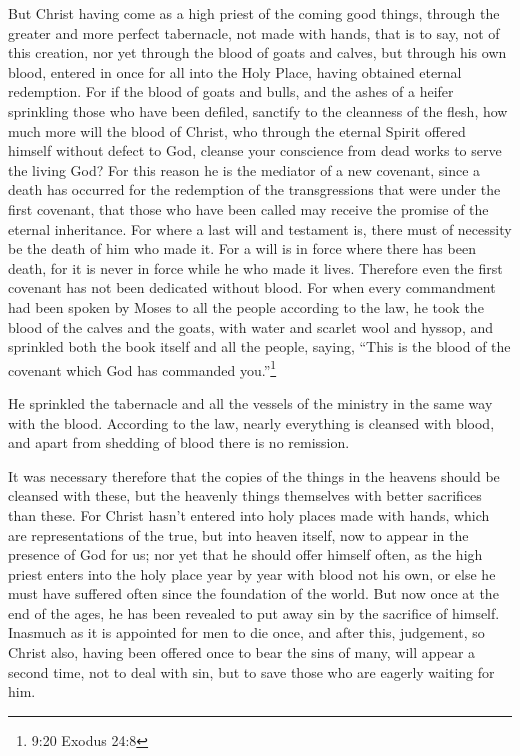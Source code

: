  But Christ having come as a high priest of the coming good
things, through the greater and more perfect tabernacle, not made with
hands, that is to say, not of this creation,  nor yet
through the blood of goats and calves, but through his own blood,
entered in once for all into the Holy Place, having obtained eternal
redemption.  For if the blood of goats and bulls, and the
ashes of a heifer sprinkling those who have been defiled, sanctify to
the cleanness of the flesh,  how much more will the blood
of Christ, who through the eternal Spirit offered himself without defect
to God, cleanse your conscience from dead works to serve the living God?
 For this reason he is the mediator of a new covenant,
since a death has occurred for the redemption of the transgressions that
were under the first covenant, that those who have been called may
receive the promise of the eternal inheritance.  For where
a last will and testament is, there must of necessity be the death of
him who made it.  For a will is in force where there has
been death, for it is never in force while he who made it lives.
 Therefore even the first covenant has not been dedicated
without blood.  For when every commandment had been spoken
by Moses to all the people according to the law, he took the blood of
the calves and the goats, with water and scarlet wool and hyssop, and
sprinkled both the book itself and all the people,  saying,
``This is the blood of the covenant which God has commanded
you.''\footnote{9:20 Exodus 24:8}

 He sprinkled the tabernacle and all the vessels of the
ministry in the same way with the blood.  According to the
law, nearly everything is cleansed with blood, and apart from shedding
of blood there is no remission.

 It was necessary therefore that the copies of the things
in the heavens should be cleansed with these, but the heavenly things
themselves with better sacrifices than these.  For Christ
hasn't entered into holy places made with hands, which are
representations of the true, but into heaven itself, now to appear in
the presence of God for us;  nor yet that he should offer
himself often, as the high priest enters into the holy place year by
year with blood not his own,  or else he must have suffered
often since the foundation of the world. But now once at the end of the
ages, he has been revealed to put away sin by the sacrifice of himself.
 Inasmuch as it is appointed for men to die once, and after
this, judgement,  so Christ also, having been offered once
to bear the sins of many, will appear a second time, not to deal with
sin, but to save those who are eagerly waiting for him.

